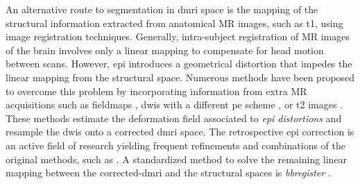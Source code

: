An alternative route to segmentation in \gls*{dmri} space is the mapping of the
  structural information extracted from anatomical MR images, such as \gls*{t1}, using
  image registration techniques.
Generally, intra-subject registration of MR images of the brain involves only a linear
  mapping to compensate for head motion between scans.
However, \gls*{epi} introduces a geometrical distortion \citep{jezzard_correction_1995}
  that impedes the linear mapping from the structural space.
Numerous methods have been proposed to overcome this problem by incorporating information
  from extra MR acquisitions such as fieldmaps \citep{jezzard_correction_1995},
  \glspl*{dwi} with a different \gls*{pe} scheme \citep{cordes_geometric_2000,chiou_simple_2000},
  or \gls*{t2} images \citep{kybic_unwarping_2000,studholme_accurate_2000}.
These methods estimate the deformation field associated to \emph{\gls*{epi} distortions} and
  resample the \glspl*{dwi} onto a corrected \gls*{dmri} space.
The retrospective \gls*{epi} correction is an active field of research yielding frequent refinements
  and combinations of the original methods, such as
  \citep{holland_efficient_2010,andersson_comprehensive_2012,
  irfanoglu_drbuddi_2015}.
A standardized method to solve the remaining linear mapping between the corrected-\gls*{dmri}
  and the structural spaces is \emph{bbregister} \citep{greve_accurate_2009}.

